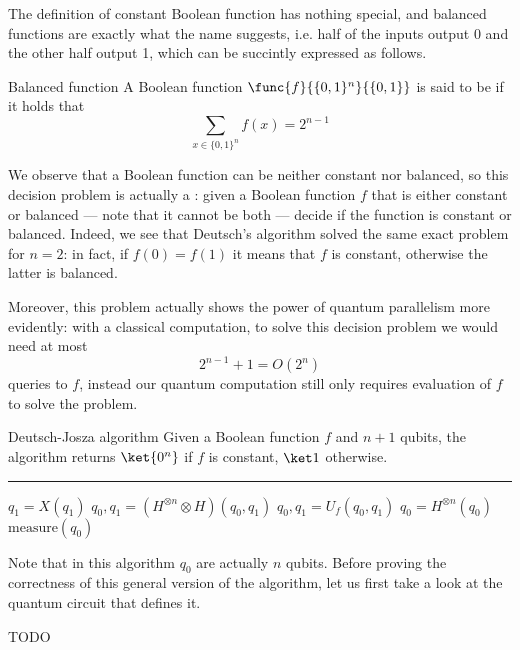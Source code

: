 \documentclass[a4paper, 12pt]{report}
\begin{document}
The definition of constant Boolean function has nothing special, and balanced functions are exactly what the name suggests, i.e. half of the inputs output 0 and the other half output 1, which can be succintly expressed as follows.

\begin{frameddefn}{Balanced function}
    A Boolean function $\func{f}{\{0, 1\}^n}{\{0,1\}}$ is said to be  if it holds that $$\sum_{x \in \{0, 1\}^n}{f(x)} = 2^{n - 1}$$
\end{frameddefn}

We observe that a Boolean function can be neither constant nor balanced, so this decision problem is actually a : given a Boolean function $f$ that is either constant or balanced --- note that it cannot be both --- decide if the function is constant or balanced. Indeed, we see that Deutsch's algorithm solved the same exact problem for $n = 2$: in fact, if $f(0) = f(1)$ it means that $f$ is constant, otherwise the latter is balanced.

Moreover, this problem actually shows the power of quantum parallelism more evidently: with a classical computation, to solve this decision problem we would need at most $$2^{n - 1} + 1 = O(2^n)$$ queries to $f$, instead our quantum computation still only requires  evaluation of $f$ to solve the problem.

\begin{framedalgo}{Deutsch-Josza algorithm}
    Given a Boolean function $f$ and $n + 1$ qubits, the algorithm returns $\ket{0^n}$ if $f$ is constant, $\ket 1$ otherwise. \\
    \hrule

    \quad
    \begin{algorithmic}[1]
            \State $q_1 = X(q_1)$
            \State $q_0, q_1 = (H^{\otimes n} \otimes H)(q_0, q_1)$
            \State $q_0, q_1 = U_f(q_0, q_1)$
            \State $q_0 = H^{\otimes n}(q_0)$
            \State {} $\mbox{measure}(q_0)$
        \EndFunction
    \end{algorithmic}
\end{framedalgo}

Note that in this algorithm $q_0$ are actually $n$ qubits. Before proving the correctness of this general version of the algorithm, let us first take a look at the quantum circuit that defines it.

TODO 

\printbibliography %
\end{document}
